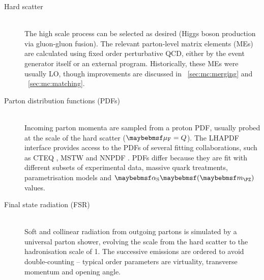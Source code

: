 \begin{description}
\item[Hard scatter] \hfill \\
	The high scale process can be selected as desired (\eg Higgs boson production via 
	gluon-gluon fusion). The relevant parton-level matrix elements (MEs) are calculated 
	using fixed order perturbative QCD, either by the event generator itself or an 
	external program. Historically, these MEs were usually LO, though improvements are 
	discussed in \Section~\ref{sec:mc:merging} and \Section~\ref{sec:mc:matching}.
\item[Parton distribution functions (PDFs)] \hfill \\
	Incoming parton momenta are sampled from a proton PDF, usually probed at the 
	scale of the hard scatter ($\muf = Q$). The LHAPDF interface \cite{LHAPDF} provides 
	access to the PDFs of several fitting collaborations, such as CTEQ \cite{CTEQ}, 
	MSTW \cite{MSTW} and NNPDF \cite{NNPDF}. PDFs differ because they are fit with 
	different subsets of experimental data, massive quark treatments, parametrisation 
	models and $\alphaS \parenths{\mZ}$ values.
\item[Final state radiation (FSR)] \hfill \\
	Soft and collinear radiation from outgoing partons is simulated by a universal parton 
	shower, evolving the scale from the hard scatter to the hadronisation scale of 
	\about\unit{1}{\GeV}. The successive emissions are ordered to avoid double-counting --
	typical order parameters are virtuality, transverse momentum and opening angle.


\end{description}
